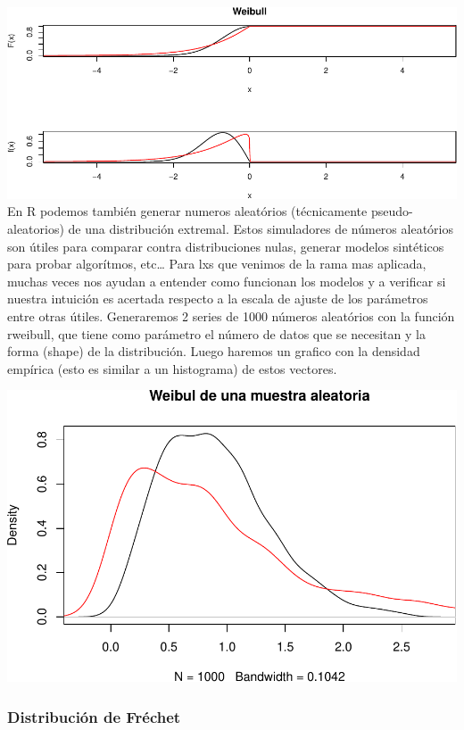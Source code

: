 \documentclass[
]{book}
\theoremstyle{definition}
\theoremstyle{definition}
\theoremstyle{definition}
\theoremstyle{definition}
\theoremstyle{remark}
\begin{document}
\includegraphics{_main_files/figure-latex/unnamed-chunk-10-1.pdf}
En R podemos también generar numeros aleatórios (técnicamente pseudo-aleatorios) de una distribución extremal. Estos simuladores de números aleatórios son útiles para comparar contra distribuciones nulas, generar modelos sintéticos para probar algorítmos, etc\ldots{}
Para lxs que venimos de la rama mas aplicada, muchas veces nos ayudan a entender como funcionan los modelos y a verificar si nuestra intuición es acertada respecto a la escala de ajuste de los parámetros entre otras útiles. Generaremos 2 series de 1000 números aleatórios con la función rweibull, que tiene como parámetro el número de datos que se necesitan y la forma (shape) de la distribución. Luego haremos un grafico con la densidad empírica (esto es similar a un histograma) de estos vectores.

\includegraphics{_main_files/figure-latex/unnamed-chunk-11-1.pdf}

\subsubsection{Distribución de Fréchet}\label{distribuciuxf3n-de-fruxe9chet}
\end{document}
